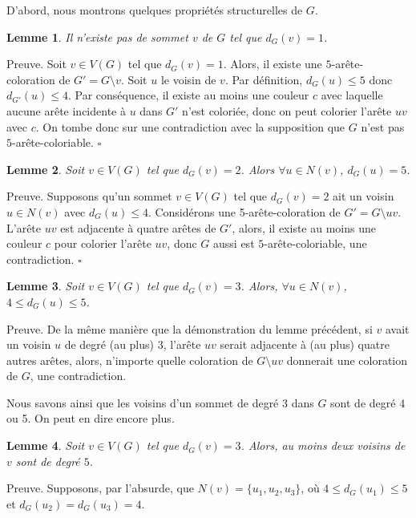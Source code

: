 \documentclass[10pt,a4paper]{article}
\newtheorem{lemme}{Lemme}
\newcommand{\ep}{{\hfill $\square$}}
\begin{document}
D'abord, nous montrons quelques propriétés structurelles de $G$.

\begin{lemme}
Il n'existe pas de sommet $v$ de $G$ tel que $d_G(v) = 1$.
\label{le:1}
\end{lemme}

Preuve. Soit $v \in V(G)$ tel que $d_G(v) = 1$. Alors, il existe une $5$-arête-coloration de $G'=G \setminus v$. Soit $u$ le voisin de $v$. Par définition, $d_G(u) \leq 5$ donc $d_{G'}(u) \leq 4$. Par conséquence, il existe au moins une couleur $c$ avec laquelle aucune arête incidente à $u$ dans $G'$ n'est coloriée, donc on peut colorier l'arête $uv$ avec $c$. On tombe donc sur une contradiction avec la supposition que $G$ n'est pas $5$-arête-coloriable.
\ep

\begin{lemme}
Soit $v \in V(G)$ tel que $d_G(v) = 2$. Alors $\forall u \in N(v)$, $d_G(u) = 5$.
\label{le:2}
\end{lemme}

Preuve.
Supposons qu'un sommet $v \in V(G)$ tel que $d_G(v) = 2$ ait un voisin $u \in N(v)$ avec $d_G(u)  \le 4$. Considérons une 5-arête-coloration de $G' = G \setminus uv$.
L'arête $uv$ est adjacente à quatre arêtes de $G'$, alors, il existe au moins une couleur $c$ pour colorier l'arête $uv$, donc $G$ aussi est $5$-arête-coloriable,  une contradiction.
\ep


\begin{lemme}
Soit $v\in V(G)$ tel que $d_G(v) = 3$. Alors, $\forall u \in N(v)$, $4\le d_G(u) \le 5$.
\label{le:33}
\end{lemme}

Preuve. De la même manière que la démonstration du lemme précédent, si $v$ avait un voisin $u$ de degré (au plus) 3, l'arête $uv$ serait adjacente à (au plus) quatre autres arêtes, alors, n'importe quelle coloration de $G\setminus uv$ donnerait une coloration de $G$, une contradiction.

Nous savons ainsi que les voisins d'un sommet de degré 3 dans $G$ sont de degré 4 ou 5. On peut en dire encore plus.

\begin{lemme}
Soit $v\in V(G)$ tel que $d_G(v) = 3$. Alors, au moins deux voisins de $v$ sont de degré $5$.
\label{le:434}
\end{lemme}

Preuve.
Supposons, par l'absurde, que $N(v)=\{u_1,u_2,u_3\}$, où $4\le d_G(u_1) \le 5$ et  $d_G(u_2) = d_G(u_3) = 4$. 
\end{document}

